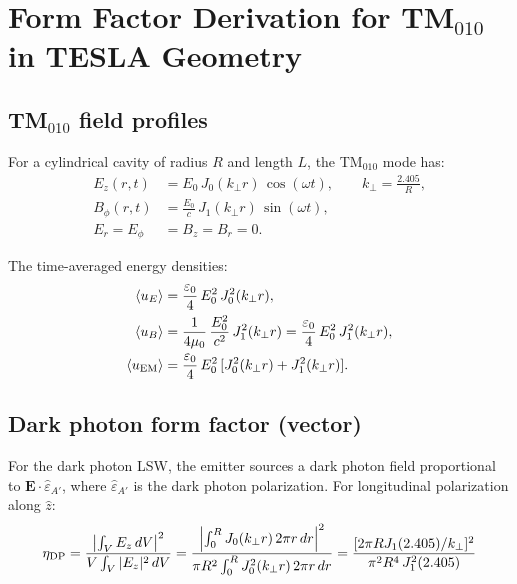 \documentclass[11pt]{article}
\theoremstyle{definition}
\theoremstyle{remark}
\begin{document}
\section{Form Factor Derivation for TM$_{010}$ in TESLA Geometry}
\label{sec:form_factor}

\subsection{TM$_{010}$ field profiles}

For a cylindrical cavity of radius $R$ and length $L$, the TM$_{010}$
mode has:
\begin{align}
E_z(r,t) &= E_0\,J_0(k_\perp r)\,\cos(\omega t), \qquad
k_\perp = \frac{2.405}{R}, \label{eq:Ez}\\
B_\phi(r,t) &= \frac{E_0}{c}\,J_1(k_\perp r)\,\sin(\omega t), \label{eq:Bphi}\\
E_r = E_\phi &= B_z = B_r = 0. \label{eq:zeros}
\end{align}

The time-averaged energy densities:
\begin{align}
\langle u_E\rangle &= \frac{\varepsilon_0}{4}\,E_0^2\,J_0^2(k_\perp r),
\label{eq:uE}\\
\langle u_B\rangle &= \frac{1}{4\mu_0}\,\frac{E_0^2}{c^2}\,J_1^2(k_\perp r)
= \frac{\varepsilon_0}{4}\,E_0^2\,J_1^2(k_\perp r),
\label{eq:uB}\\
\langle u_{\rm EM}\rangle &= \frac{\varepsilon_0}{4}\,E_0^2\,
[J_0^2(k_\perp r) + J_1^2(k_\perp r)].
\label{eq:uEM}
\end{align}

\subsection{Dark photon form factor (vector)}

For the dark photon LSW, the emitter sources a dark photon field
proportional to $\mathbf{E}\cdot\hat{\varepsilon}_{A'}$, where
$\hat{\varepsilon}_{A'}$ is the dark photon polarization. For
longitudinal polarization along $\hat{z}$:
\begin{equation}
\eta_{\rm DP} = \frac{\left|\int_V E_z\,dV\right|^2}
{V\int_V |E_z|^2\,dV}
= \frac{\left|\int_0^R J_0(k_\perp r)\,2\pi r\,dr\right|^2}
{\pi R^2 \int_0^R J_0^2(k_\perp r)\,2\pi r\,dr}
= \frac{[2\pi R J_1(2.405)/k_\perp]^2}
{\pi^2 R^4\,J_1^2(2.405)}
\label{eq:eta_DP_calc}
\end{equation}
\end{document}
